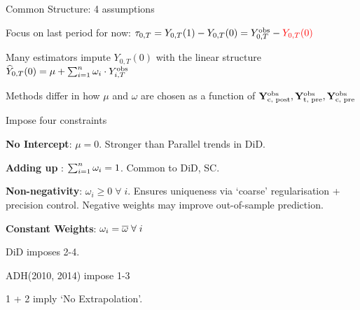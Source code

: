 \documentclass[12pt, aspectratio=169]{beamer}
\begin{document}
\begin{frame}{Common Structure: 4 assumptions}

\bi[<+->]
  \item Focus on last period for now:  $\tau_{0, T} = Y_{0, T} (1) -
    Y_{0, T}(0) = Y_{0, T}^{\text{obs}} - \textcolor{red}{Y_{0, T}(0)}$
  \item Many estimators impute $Y_{0, T}(0)$ with the linear structure
  $\widehat{Y}_{0, T} (0) = \mu + \sum_{i=1}^n \omega_i \cdot Y_{i, T}^{\text{obs}}$
    \bi
      \item Methods differ in how $\mu$ and $\omega$ are chosen as a function of
      $\mathbf{Y}_{\text{c, post}}^{\text{obs}} , \mathbf{Y}_{\text{t,
      pre}}^{\text{obs}} ,  \mathbf{Y}_{\text{c, pre}}^{\text{obs}}$
    \ei
  \item Impose four constraints
    \be
      \item \textbf{No Intercept}: $\mu = 0$. Stronger than Parallel trends in DiD.
      \item \textbf{Adding up} : $\sum_{i=1}^n \omega_i = 1$. Common to DiD, SC.
      \item \textbf{Non-negativity}: $\omega_i \geq 0 \; \forall \;
      i$. Ensures uniqueness via `coarse' regularisation + precision
      control. Negative weights may improve out-of-sample prediction.

      \item \textbf{Constant Weights}: $\omega_i = \overline{\omega} \; \forall \; i$
    \ee
  \item DiD imposes 2-4.
  \item ADH(2010, 2014) impose 1-3
    \bi
    \item 1 + 2 imply `No Extrapolation'.
    \ei

\ei

\end{frame}
\end{document}

